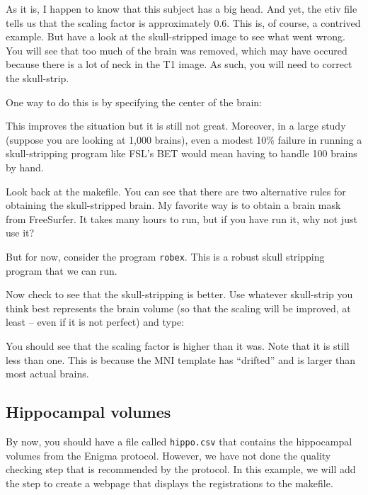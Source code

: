 As it is, I happen to know that this subject has a big head. And yet, the etiv file tells us that the scaling factor is approximately 0.6. This is, of course, a contrived example. But have a look at the skull-stripped image to see what went wrong. You will see that too
much of the brain was removed, which may have occured because there is a lot of neck in the T1 image.
As such, you will need to correct the skull-strip.

One way to do this is by specifying the center of the brain:

This improves the situation but it is still not great. Moreover, in a large study (suppose you are looking at 1,000 brains), even a modest 10\% failure in running a skull-stripping program like FSL's BET would mean having to handle 100 brains by hand.  

Look back at the makefile. You can see that there are two alternative rules for
obtaining the skull-stripped brain. My favorite way is to obtain a brain
mask from FreeSurfer. It takes many hours to run, but if you have run 
it, why not just use it? %

But for now, consider the program \texttt{robex}. This is a robust
skull stripping program \citep{Iglesias2011} that we can run.

Now check to see that the skull-stripping is better. Use whatever skull-strip you think best represents the brain volume (so that the scaling will be improved, at least -- even if it is not perfect) and type:

You should see that the scaling factor is higher than it
was. Note that it is still less than one. This is because the MNI
template has ``drifted'' and is larger than most actual brains. 

\subsection{Hippocampal volumes}
By now, you should have a file called \texttt{hippo.csv} that contains the hippocampal volumes from the Enigma protocol. However, we have not done the quality checking step that is recommended by the protocol. In this example, we will add the step to create a webpage that displays the registrations to the makefile.

